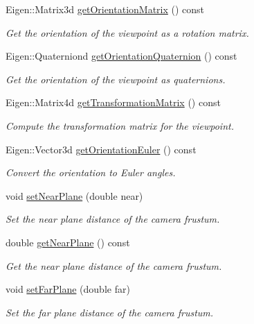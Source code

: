 \begin{DoxyCompactItemize}
Eigen\+::\+Matrix3d \hyperlink{classvisioncraft_1_1Viewpoint_a160da053602ad2033650b07d995da95a}{get\+Orientation\+Matrix} () const
\begin{DoxyCompactList}\small\item\em Get the orientation of the viewpoint as a rotation matrix. \end{DoxyCompactList}\item 
Eigen\+::\+Quaterniond \hyperlink{classvisioncraft_1_1Viewpoint_a9d594ba3c04f61b1998d1af990960648}{get\+Orientation\+Quaternion} () const
\begin{DoxyCompactList}\small\item\em Get the orientation of the viewpoint as quaternions. \end{DoxyCompactList}\item 
Eigen\+::\+Matrix4d \hyperlink{classvisioncraft_1_1Viewpoint_af918ce4f4c39be7d461b9f80ee442120}{get\+Transformation\+Matrix} () const
\begin{DoxyCompactList}\small\item\em Compute the transformation matrix for the viewpoint. \end{DoxyCompactList}\item 
Eigen\+::\+Vector3d \hyperlink{classvisioncraft_1_1Viewpoint_a893455a682229abfa11fcc8bba3af310}{get\+Orientation\+Euler} () const
\begin{DoxyCompactList}\small\item\em Convert the orientation to Euler angles. \end{DoxyCompactList}\item 
void \hyperlink{classvisioncraft_1_1Viewpoint_adfb76d3eb8a11b69fd6368d20801f82e}{set\+Near\+Plane} (double near)
\begin{DoxyCompactList}\small\item\em Set the near plane distance of the camera frustum. \end{DoxyCompactList}\item 
double \hyperlink{classvisioncraft_1_1Viewpoint_ae33dd06cba85412548920a0dfe25a5cd}{get\+Near\+Plane} () const
\begin{DoxyCompactList}\small\item\em Get the near plane distance of the camera frustum. \end{DoxyCompactList}\item 
void \hyperlink{classvisioncraft_1_1Viewpoint_a252c7746319b10a6f41bdb11c01a8487}{set\+Far\+Plane} (double far)
\begin{DoxyCompactList}\small\item\em Set the far plane distance of the camera frustum. \end{DoxyCompactList}\item 

\end{DoxyCompactItemize}
